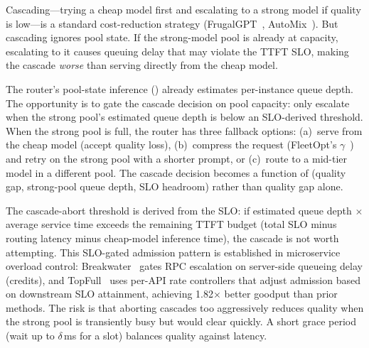 \begin{opportunity}
\label{opp:pool-cascade}
Cascading---trying a cheap model first and escalating to a
strong model if quality is low---is a standard cost-reduction
strategy (FrugalGPT~\cite{chen2023frugalgpt},
AutoMix~\cite{madaan2024automix}).  But cascading ignores
pool state.  If the strong-model pool is already at capacity,
escalating to it causes queuing delay that may violate the
TTFT SLO, making the cascade \emph{worse} than serving
directly from the cheap model.

The router's pool-state inference ()
already estimates per-instance queue depth.  The opportunity
is to gate the cascade decision on pool capacity: only escalate
when the strong pool's estimated queue depth is below an
SLO-derived threshold.  When the strong pool is full, the router
has three fallback options: (a)~serve from the cheap model
(accept quality loss), (b)~compress the request
(FleetOpt's $\gamma$~\cite{fleetopt2026}) and retry on the
strong pool with a shorter prompt, or (c)~route to a mid-tier
model in a different pool.  The cascade decision becomes a
function of (quality gap, strong-pool queue depth, SLO headroom)
rather than quality gap alone.

\begin{frisk}
The cascade-abort threshold is derived from the SLO: if
estimated queue depth $\times$ average service time exceeds the
remaining TTFT budget (total SLO minus routing latency minus
cheap-model inference time), the cascade is not worth
attempting.  This SLO-gated admission pattern is established
in microservice overload control:
Breakwater~\cite{cho2020breakwater} gates RPC escalation on
server-side queueing delay (credits), and
TopFull~\cite{topfull2024} uses per-API rate controllers that
adjust admission based on downstream SLO attainment, achieving
1.82$\times$ better goodput than prior methods.  The risk is
that aborting cascades too aggressively reduces quality when the
strong pool is transiently busy but would clear quickly.  A
short grace period (wait up to $\delta$\,ms for a slot) balances
quality against latency.
\end{frisk}
\end{opportunity}

